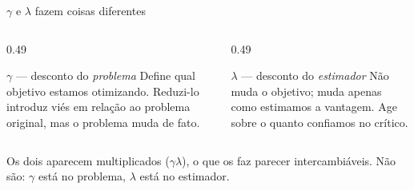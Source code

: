 \documentclass[aspectratio=169, 10pt]{beamer}
\begin{document}
\begin{frame}{$\gamma$ e $\lambda$ fazem coisas diferentes}

  \begin{center}
  \end{center}

  \begin{columns}[T]
  \begin{column}{0.49\textwidth}
    \begin{defbox}{$\gamma$ --- desconto do \emph{problema}}
      Define qual objetivo estamos otimizando. Reduzi-lo introduz viés em relação
      ao problema original, mas o problema muda de fato.
    \end{defbox}
  \end{column}
  \begin{column}{0.49\textwidth}
    \begin{defbox}{$\lambda$ --- desconto do \emph{estimador}}
      Não muda o objetivo; muda apenas como estimamos a vantagem. Age sobre o quanto
      confiamos no crítico.
    \end{defbox}
  \end{column}
  \end{columns}

  \begin{alertabox}
    Os dois aparecem multiplicados ($\gamma\lambda$), o que os faz parecer
    intercambiáveis. Não são: $\gamma$ está no problema, $\lambda$ está no estimador.
  \end{alertabox}
\end{frame}
\end{document}
